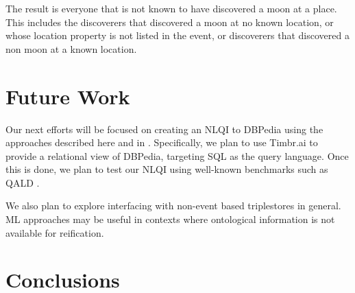 \documentclass[../main.tex]{subfiles}
\begin{document}
\begin{refsection}
\examplespacing


\examplespacing

\noindent The result is everyone that is not known to have discovered a moon at a place.  This includes the discoverers that discovered a moon at no known location, or whose location property is not listed in the event, or discoverers that discovered a non moon at a known location.

\section{Future Work}
\label{webist2020conf:future}

\noindent Our next efforts will be focused on creating an NLQI to DBPedia using the approaches
described here and in \cite{peelar2020webistjournal}.  Specifically, we plan to use Timbr.ai \cite{timbr} to provide a relational view of DBPedia, targeting SQL as the query language.
Once this is done, we plan to test our NLQI using well-known benchmarks such as QALD \cite{qald9}.

We also plan to explore interfacing with non-event based triplestores in general.  ML approaches may be useful in contexts where ontological information is not available for reification.


\section{Conclusions}
\label{webist2020conf:conclusion}


\end{refsection}
\end{document}
